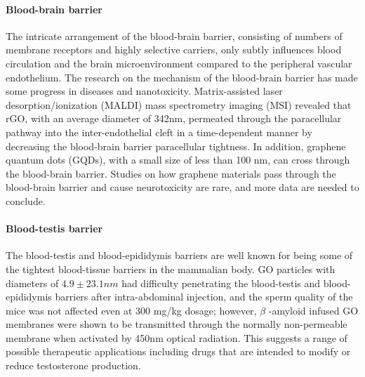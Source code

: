 \documentclass[twoside,twocolumn,9pt]{article}
\begin{document}
\paragraph{Blood-brain barrier}The intricate arrangement of the blood-brain barrier, consisting of numbers of membrane receptors and highly selective carriers, only subtly influences blood circulation and the brain microenvironment compared to the peripheral vascular endothelium. The research on the mechanism of the blood-brain barrier has made some progress in diseases and nanotoxicity. Matrix-assisted laser desorption/ionization (MALDI) mass spectrometry imaging (MSI) revealed that rGO, with an average diameter of 342nm, permeated through the paracellular pathway into the inter-endothelial cleft in a time-dependent manner by decreasing the blood-brain barrier paracellular tightness. In addition, graphene quantum dots (GQDs), with a small size of less than 100 nm, can cross through the blood-brain barrier. Studies on how graphene materials pass through the blood-brain barrier and cause neurotoxicity are rare, and more data are needed to conclude.

\paragraph{Blood-testis barrier}The blood-testis and blood-epididymis barriers are well known for being some of the tightest blood-tissue barriers in the mammalian body. GO particles with diameters of $4.9 \pm 23.1 nm$ had difficulty penetrating the blood-testis and blood-epididymis barriers after intra-abdominal injection, and the sperm quality of the mice was not affected even at 300 mg/kg dosage; however, $\beta$ -amyloid infused GO membranes were shown to be transmitted through the normally non-permeable membrane when activated by 450nm optical radiation. This suggests a range of possible therapeutic applications including drugs that are intended to modify or reduce testosterone production.
\end{document}
